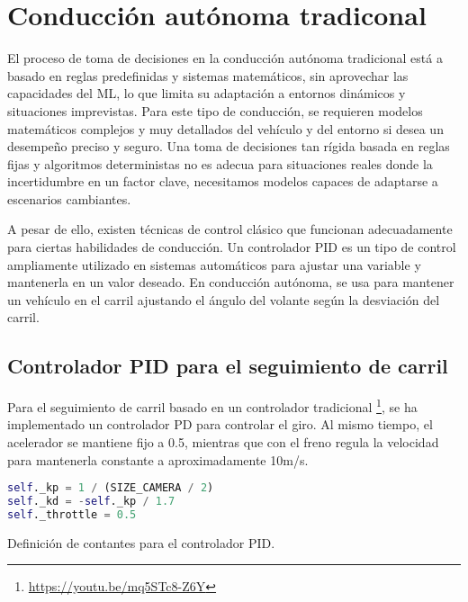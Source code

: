 \section{Conducción autónoma tradiconal}

El proceso de toma de decisiones en la conducción autónoma tradicional está a basado en reglas predefinidas y sistemas matemáticos, sin aprovechar las capacidades del \ac{ML}, lo que limita su adaptación a entornos dinámicos y situaciones imprevistas. Para este tipo de conducción, se requieren modelos matemáticos complejos y muy detallados del vehículo y del entorno si desea un desempeño preciso y seguro. Una toma de decisiones tan rígida basada en reglas fijas y algoritmos deterministas no es adecua para situaciones reales donde la incertidumbre en un factor clave, necesitamos modelos capaces de adaptarse a escenarios cambiantes. 

A pesar de ello, existen técnicas de control clásico que funcionan adecuadamente para ciertas habilidades de conducción. Un controlador \ac{PID} es un tipo de control ampliamente utilizado en sistemas automáticos para ajustar una variable y mantenerla en un valor deseado. En conducción autónoma, se usa para mantener un vehículo en el carril ajustando el ángulo del volante según la desviación del carril.

\subsection{Controlador \ac{PID} para el seguimiento de carril}
Para el seguimiento de carril basado en un controlador tradicional \footnote{\url{https://youtu.be/mq5STc8-Z6Y}}, se ha implementado un controlador PD para controlar el giro. Al mismo tiempo, el acelerador se mantiene fijo a 0.5, mientras que con el freno regula la velocidad para mantenerla constante a aproximadamente 10m/s.
\begin{code}[h]
\begin{lstlisting}[language=Python]
self._kp = 1 / (SIZE_CAMERA / 2)
self._kd = -self._kp / 1.7
self._throttle = 0.5
\end{lstlisting}
\caption[Definición de contantes para el controlador \ac{PID}]{Definición de contantes para el controlador \ac{PID}.}
\label{cod:const_pid}
\end{code}

